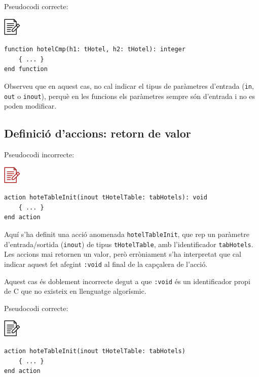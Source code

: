 \documentclass[
]{book}
\begin{document}
Pseudocodi correcte:

\includegraphics{./img/alg.png}

\begin{verbatim}
function hotelCmp(h1: tHotel, h2: tHotel): integer
    { ... }
end function
\end{verbatim}

Observeu que en aquest cas, no cal indicar el tipus de paràmetres d'entrada (\texttt{in}, \texttt{out} o \texttt{inout}), perquè en les funcions els paràmetres sempre són d'entrada i no es poden modificar.

\hypertarget{definiciuxf3-daccions-retorn-de-valor}{%
\subsection{Definició d'accions: retorn de valor}\label{definiciuxf3-daccions-retorn-de-valor}}

Pseudocodi incorrecte:

\includegraphics{./img/alg_err.png}

\begin{verbatim}
action hoteTableInit(inout tHotelTable: tabHotels): void
    { ... }
end action
\end{verbatim}

Aquí s'ha definit una acció anomenada \texttt{hotelTableInit}, que rep un paràmetre d'entrada/sortida (\texttt{inout}) de tipus \texttt{tHotelTable}, amb l'identificador \texttt{tabHotels}. Les accions mai retornen un valor, però erròniament s'ha interpretat que cal indicar aquest fet afegint \texttt{:void} al final de la capçalera de l'acció.

Aquest cas és doblement incorrecte degut a que \texttt{:void} és un identificador propi de C que no existeix en llenguatge algorísmic.

Pseudocodi correcte:

\includegraphics{./img/alg.png}

\begin{verbatim}
action hoteTableInit(inout tHotelTable: tabHotels)
    { ... }
end action
\end{verbatim}
\end{document}

